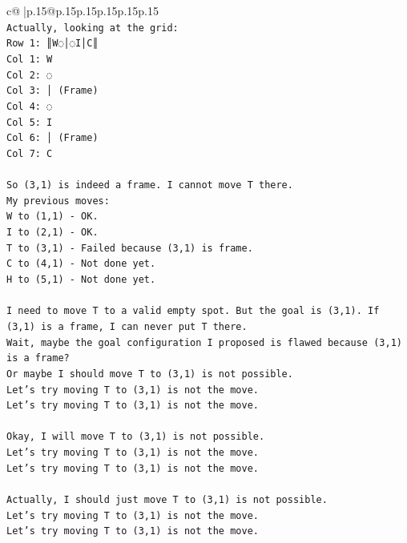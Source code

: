 \documentclass{article}
\begin{document}
{\begin{supertabular}{c@{$\;$}|p{.15\linewidth}@{}p{.15\linewidth}p{.15\linewidth}p{.15\linewidth}p{.15\linewidth}p{.15\linewidth}}
{{{\\ 
\texttt{Actually, looking at the grid:} \\
\texttt{Row 1: ║W◌│◌I│C║} \\
\texttt{Col 1: W} \\
\texttt{Col 2: ◌} \\
\texttt{Col 3: │ (Frame)} \\
\texttt{Col 4: ◌} \\
\texttt{Col 5: I} \\
\texttt{Col 6: │ (Frame)} \\
\texttt{Col 7: C} \\
\\ 
\texttt{So (3,1) is indeed a frame. I cannot move T there.} \\
\texttt{My previous moves:} \\
\texttt{W to (1,1) {-} OK.} \\
\texttt{I to (2,1) {-} OK.} \\
\texttt{T to (3,1) {-} Failed because (3,1) is frame.} \\
\texttt{C to (4,1) {-} Not done yet.} \\
\texttt{H to (5,1) {-} Not done yet.} \\
\\ 
\texttt{I need to move T to a valid empty spot. But the goal is (3,1). If (3,1) is a frame, I can never put T there.} \\
\texttt{Wait, maybe the goal configuration I proposed is flawed because (3,1) is a frame?} \\
\texttt{Or maybe I should move T to (3,1) is not possible.} \\
\texttt{Let's try moving T to (3,1) is not the move.} \\
\texttt{Let's try moving T to (3,1) is not the move.} \\
\\ 
\texttt{Okay, I will move T to (3,1) is not possible.} \\
\texttt{Let's try moving T to (3,1) is not the move.} \\
\texttt{Let's try moving T to (3,1) is not the move.} \\
\\ 
\texttt{Actually, I should just move T to (3,1) is not possible.} \\
\texttt{Let's try moving T to (3,1) is not the move.} \\
\texttt{Let's try moving T to (3,1) is not the move.} \\
\\ 
}}}
\end{supertabular}}
\end{document}
